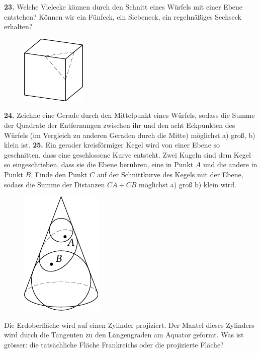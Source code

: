 \documentclass[12pt]{article} %
\begin{document}
\newpage
\noindent
{\bf 23.} Welche Vielecke können durch den Schnitt eines Würfels mit einer Ebene entstehen? Können wir ein Fünfeck, ein Siebeneck, ein regelmäßiges Sechseck erhalten? 
\begin{figure}[h]
\centering
\footnotesize
\includegraphics[scale=1]{taskbook-7}
\end{figure}
\newline\newline\quad
{\bf 24.} Zeichne eine Gerade durch den Mittelpunkt eines Würfels, sodass die Summe der Quadrate der Entfernungen zwischen ihr und den acht Eckpunkten des Würfels (im Vergleich zu anderen Geraden durch die Mitte) möglichst a) groß, b) klein ist.
\newline\newline\quad
{\bf 25.} Ein gerader kreisförmiger Kegel wird von einer Ebene so geschnitten, dass eine geschlossene Kurve entsteht. Zwei Kugeln sind dem Kegel so eingeschrieben, dass sie die Ebene berühren, eine in Punkt $A$ und die andere in Punkt $B$. Finde den Punkt $C$ auf der Schnittkurve des Kegels mit der Ebene, sodass die Summe der Distanzen $CA + CB$ möglichst a) groß b) klein wird. 
\begin{figure}[h]
\centering
\footnotesize
\includegraphics[scale=1]{taskbook-9}
\end{figure} 
\newline\newline{} Die Erdoberfläche wird auf einen Zylinder projiziert. Der Mantel dieses Zylinders wird durch die Tangenten zu den Längengraden am Äquator geformt. Was ist grösser: die tatsächliche Fläche Frankreichs oder die projizierte Fläche?
\end{document}
